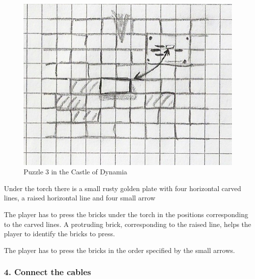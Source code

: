 \begin{figure}[H]
  \centering
  \includegraphics[width=\textwidth]{Images/Puzzles/castleOfDynamia_3}
  \caption{Puzzle 3 in the Castle of Dynamia}
\end{figure}



Under the torch there is a small rusty golden plate with four horizontal carved lines, a raised horizontal line and four small arrow

The player has to press the bricks under the torch in the positions corresponding to the carved lines. A protruding brick, corresponding to the raised line, helps the player to identify the bricks to press.

The player has to press the bricks in the order specified by the small arrows.

\subsubsection{4. Connect the cables}

